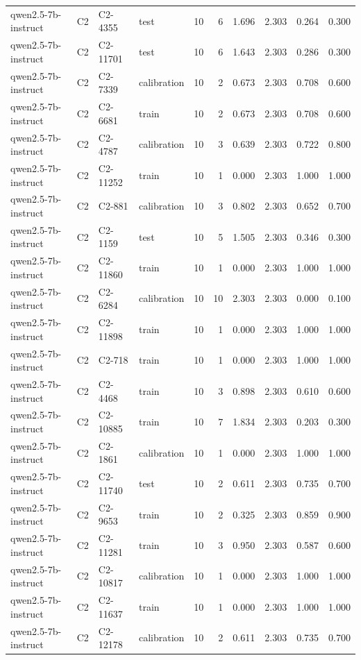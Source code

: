 \begin{table}
\begin{tabular}{llllrrrrrr}
qwen2.5-7b-instruct & C2 & C2-4355 & test & 10 & 6 & 1.696 & 2.303 & 0.264 & 0.300 \\
qwen2.5-7b-instruct & C2 & C2-11701 & test & 10 & 6 & 1.643 & 2.303 & 0.286 & 0.300 \\
qwen2.5-7b-instruct & C2 & C2-7339 & calibration & 10 & 2 & 0.673 & 2.303 & 0.708 & 0.600 \\
qwen2.5-7b-instruct & C2 & C2-6681 & train & 10 & 2 & 0.673 & 2.303 & 0.708 & 0.600 \\
qwen2.5-7b-instruct & C2 & C2-4787 & calibration & 10 & 3 & 0.639 & 2.303 & 0.722 & 0.800 \\
qwen2.5-7b-instruct & C2 & C2-11252 & train & 10 & 1 & 0.000 & 2.303 & 1.000 & 1.000 \\
qwen2.5-7b-instruct & C2 & C2-881 & calibration & 10 & 3 & 0.802 & 2.303 & 0.652 & 0.700 \\
qwen2.5-7b-instruct & C2 & C2-1159 & test & 10 & 5 & 1.505 & 2.303 & 0.346 & 0.300 \\
qwen2.5-7b-instruct & C2 & C2-11860 & train & 10 & 1 & 0.000 & 2.303 & 1.000 & 1.000 \\
qwen2.5-7b-instruct & C2 & C2-6284 & calibration & 10 & 10 & 2.303 & 2.303 & 0.000 & 0.100 \\
qwen2.5-7b-instruct & C2 & C2-11898 & train & 10 & 1 & 0.000 & 2.303 & 1.000 & 1.000 \\
qwen2.5-7b-instruct & C2 & C2-718 & train & 10 & 1 & 0.000 & 2.303 & 1.000 & 1.000 \\
qwen2.5-7b-instruct & C2 & C2-4468 & train & 10 & 3 & 0.898 & 2.303 & 0.610 & 0.600 \\
qwen2.5-7b-instruct & C2 & C2-10885 & train & 10 & 7 & 1.834 & 2.303 & 0.203 & 0.300 \\
qwen2.5-7b-instruct & C2 & C2-1861 & calibration & 10 & 1 & 0.000 & 2.303 & 1.000 & 1.000 \\
qwen2.5-7b-instruct & C2 & C2-11740 & test & 10 & 2 & 0.611 & 2.303 & 0.735 & 0.700 \\
qwen2.5-7b-instruct & C2 & C2-9653 & train & 10 & 2 & 0.325 & 2.303 & 0.859 & 0.900 \\
qwen2.5-7b-instruct & C2 & C2-11281 & train & 10 & 3 & 0.950 & 2.303 & 0.587 & 0.600 \\
qwen2.5-7b-instruct & C2 & C2-10817 & calibration & 10 & 1 & 0.000 & 2.303 & 1.000 & 1.000 \\
qwen2.5-7b-instruct & C2 & C2-11637 & train & 10 & 1 & 0.000 & 2.303 & 1.000 & 1.000 \\
qwen2.5-7b-instruct & C2 & C2-12178 & calibration & 10 & 2 & 0.611 & 2.303 & 0.735 & 0.700 \\

\end{tabular}
\end{table}
